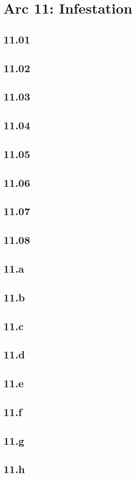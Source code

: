 \part*{Arc 11: Infestation}
 \chapter*{11.01}
 \chapter*{11.02}
 \chapter*{11.03}
 \chapter*{11.04}
 \chapter*{11.05}
 \chapter*{11.06}
 \chapter*{11.07}
 \chapter*{11.08}
 \chapter*{11.a}
 \chapter*{11.b}
 \chapter*{11.c}
 \chapter*{11.d}
 \chapter*{11.e}
 \chapter*{11.f}
 \chapter*{11.g}
 \chapter*{11.h}

















